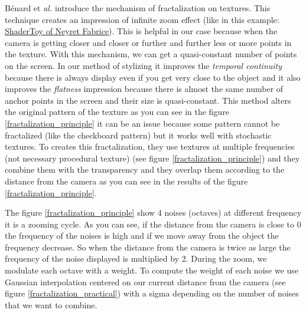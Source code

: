 Bénard et \textit{al.}\cite{benard_dynamic_2010} introduce the mechanism of fractalization on textures. This technique creates an impression of infinite zoom effect (like in this example: \href{https://www.shadertoy.com/view/XlBXWw?fbclid=IwAR1fU2JxQzXtks1ZcmVmzrHiv646G8w2gWceeiV-UToeFkAFMQ2NecbsGGs}{ShaderToy of Neyret Fabrice}). This is helpful in our case because when the camera is getting closer and closer or further and further less or more points in the texture. With this mechanism, we can get a quasi-constant number of points on the screen. In our method of stylizing it improves the \textit{temporal continuity} because there is always display even if you get very close to the object and it also improves the \textit{flatness} impression because there is almost the same number of anchor points in the screen and their size is quasi-constant. This method alters the original pattern of the texture as you can see in the figure \ref{fractalization_principle} it can be an issue because some pattern cannot be fractalized (like the checkboard pattern) but it works well with stochastic textures. To creates this fractalization, they use textures at multiple frequencies (not necessary procedural texture) (see figure \ref{fractalization_principle}) and they combine them with the transparency and they overlap them according to the distance from the camera as you can see in the results of the figure \ref{fractalization_principle}. \newline


The figure \ref{fractalization_principle} show 4 noises (octaves) at different frequency it is a zooming cycle. As you can see, if the distance from the camera is close to 0 the frequency of the noises is high and if we move away from the object the frequency decrease. So when the distance from the camera is twice as large the frequency of the noise displayed is multiplied by 2. During the zoom, we modulate each octave with a weight. To compute the weight of each noise we use Gaussian interpolation centered on our current distance from the camera (see figure \ref{fractalization_practical}) with a sigma depending on the number of noises that we want to combine.









